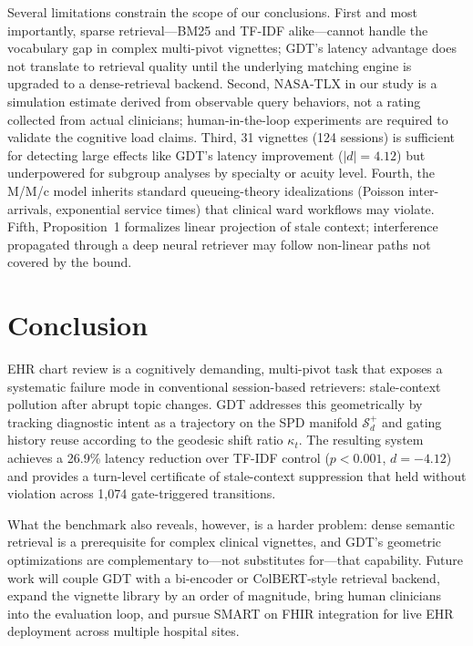 \documentclass[review]{elsarticle}
\begin{document}
Several limitations constrain the scope of our conclusions. First and most
importantly, sparse retrieval---BM25 and TF-IDF
alike---cannot handle the vocabulary gap in complex multi-pivot vignettes; GDT's
latency advantage does not translate to retrieval quality until the underlying
matching engine is upgraded to a dense-retrieval backend. Second, NASA-TLX in our
study is a simulation estimate derived from observable query behaviors, not a
rating collected from actual clinicians; human-in-the-loop experiments are required
to validate the cognitive load claims. Third, 31 vignettes (124 sessions) is
sufficient for detecting large effects like GDT's latency improvement
($|d|{=}4.12$) but underpowered for subgroup analyses by specialty or acuity
level. Fourth, the M/M/c model inherits standard queueing-theory idealizations
(Poisson inter-arrivals, exponential service times) that clinical ward workflows
may violate. Fifth, Proposition~1 formalizes linear projection of stale context;
interference propagated through a deep neural retriever may follow non-linear paths
not covered by the bound.

\section{Conclusion}
\label{sec:conclusion}

EHR chart review is a cognitively demanding, multi-pivot task that exposes a
systematic failure mode in conventional session-based retrievers: stale-context
pollution after abrupt topic changes. GDT addresses this geometrically by tracking
diagnostic intent as a trajectory on the SPD manifold $\mathcal{S}_d^+$ and gating
history reuse according to the geodesic shift ratio $\kappa_t$. The resulting
system achieves a 26.9\% latency reduction over TF-IDF control ($p{<}0.001$,
$d{=}{-4.12}$) and provides a turn-level certificate of stale-context suppression
that held without violation across 1,074 gate-triggered transitions.

What the benchmark also reveals, however, is a harder problem: dense semantic
retrieval is a prerequisite for complex clinical vignettes, and
GDT's geometric optimizations are complementary to---not substitutes for---that
capability. Future work will couple GDT with a bi-encoder or ColBERT-style
\cite{khattab20} retrieval backend, expand the vignette library by an order of
magnitude, bring human clinicians into the evaluation loop, and pursue SMART on
FHIR integration for live EHR deployment across multiple hospital sites.
\end{document}
